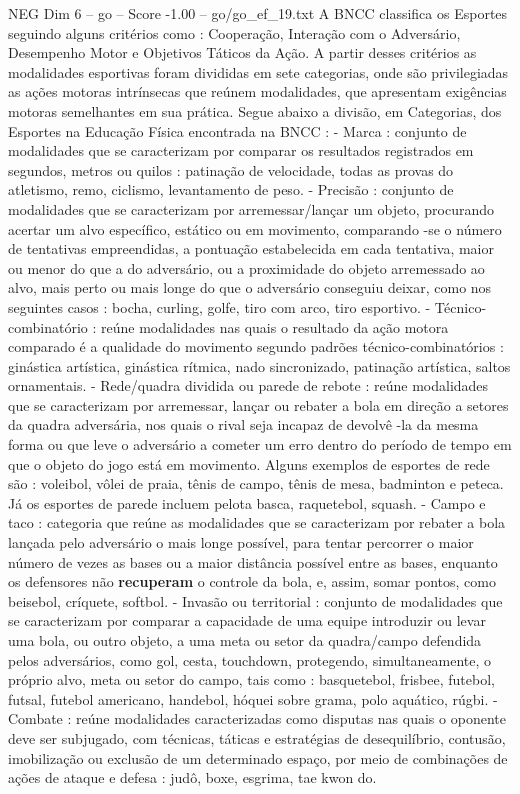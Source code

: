 \begin{textsample}{NEG Dim 6 – go – Score -1.00 – go/go\_ef\_19.txt}  \label{ex:f6_neg_174}
A BNCC classifica os Esportes seguindo alguns critérios como : Cooperação, Interação com o Adversário, Desempenho Motor e Objetivos Táticos da Ação.
A partir desses critérios as modalidades esportivas foram divididas em sete categorias, onde são privilegiadas as ações motoras intrínsecas que reúnem modalidades, que apresentam exigências motoras semelhantes em sua prática.
Segue abaixo a divisão, em Categorias, dos Esportes na Educação Física encontrada na BNCC : - Marca : conjunto de modalidades que se caracterizam por comparar os resultados registrados em segundos, metros ou quilos : patinação de velocidade, todas as provas do atletismo, remo, ciclismo, levantamento de peso. - Precisão : conjunto de modalidades que se caracterizam por arremessar/lançar um objeto, procurando acertar um alvo específico, estático ou em movimento, comparando -se o número de tentativas empreendidas, a pontuação estabelecida em cada tentativa, maior ou menor do que a do adversário, ou a proximidade do objeto arremessado ao alvo, mais perto ou mais longe do que o adversário conseguiu deixar, como nos seguintes casos : bocha, curling, golfe, tiro com arco, tiro esportivo. - Técnico-combinatório : reúne modalidades nas quais o resultado da ação motora comparado é a qualidade do movimento segundo padrões técnico-combinatórios : ginástica artística, ginástica rítmica, nado sincronizado, patinação artística, saltos ornamentais. - Rede/quadra dividida ou parede de rebote : reúne modalidades que se caracterizam por arremessar, lançar ou rebater a bola em direção a setores da quadra adversária, nos quais o rival seja incapaz de devolvê -la da mesma forma ou que leve o adversário a cometer um erro dentro do período de tempo em que o objeto do jogo está em movimento.
Alguns exemplos de esportes de rede são : voleibol, vôlei de praia, tênis de campo, tênis de mesa, badminton e peteca.
Já os esportes de parede incluem pelota basca, raquetebol, squash. - Campo e taco : categoria que reúne as modalidades que se caracterizam por rebater a bola lançada pelo adversário o mais longe possível, para tentar percorrer o maior número de vezes as bases ou a maior distância possível entre as bases, enquanto os defensores não \textbf{recuperam} o controle da bola, e, assim, somar pontos, como beisebol, críquete, softbol. - Invasão ou territorial : conjunto de modalidades que se caracterizam por comparar a capacidade de uma equipe introduzir ou levar uma bola, ou outro objeto, a uma meta ou setor da quadra/campo defendida pelos adversários, como gol, cesta, touchdown, protegendo, simultaneamente, o próprio alvo, meta ou setor do campo, tais como : basquetebol, frisbee, futebol, futsal, futebol americano, handebol, hóquei sobre grama, polo aquático, rúgbi. - Combate : reúne modalidades caracterizadas como disputas nas quais o oponente deve ser subjugado, com técnicas, táticas e estratégias de desequilíbrio, contusão, imobilização ou exclusão de um determinado espaço, por meio de combinações de ações de ataque e defesa : judô, boxe, esgrima, tae kwon do.

\end{textsample}
